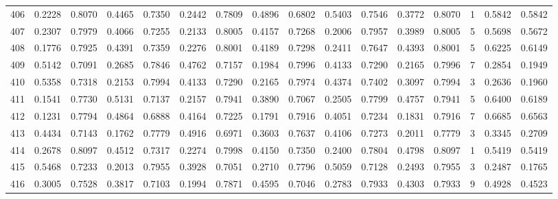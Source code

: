 \begin{tabular}{lrrrrrrrrrrrrrrr}
406 &      0.2228 &  0.8070 &  0.4465 &  0.7350 &  0.2442 &  0.7809 &  0.4896 &  0.6802 &  0.5403 &  0.7546 &   0.3772 &     0.8070 &      1 &                    0.5842 &                     0.5842 \\
407 &      0.2307 &  0.7979 &  0.4066 &  0.7255 &  0.2133 &  0.8005 &  0.4157 &  0.7268 &  0.2006 &  0.7957 &   0.3989 &     0.8005 &      5 &                    0.5698 &                     0.5672 \\
408 &      0.1776 &  0.7925 &  0.4391 &  0.7359 &  0.2276 &  0.8001 &  0.4189 &  0.7298 &  0.2411 &  0.7647 &   0.4393 &     0.8001 &      5 &                    0.6225 &                     0.6149 \\
409 &      0.5142 &  0.7091 &  0.2685 &  0.7846 &  0.4762 &  0.7157 &  0.1984 &  0.7996 &  0.4133 &  0.7290 &   0.2165 &     0.7996 &      7 &                    0.2854 &                     0.1949 \\
410 &      0.5358 &  0.7318 &  0.2153 &  0.7994 &  0.4133 &  0.7290 &  0.2165 &  0.7974 &  0.4374 &  0.7402 &   0.3097 &     0.7994 &      3 &                    0.2636 &                     0.1960 \\
411 &      0.1541 &  0.7730 &  0.5131 &  0.7137 &  0.2157 &  0.7941 &  0.3890 &  0.7067 &  0.2505 &  0.7799 &   0.4757 &     0.7941 &      5 &                    0.6400 &                     0.6189 \\
412 &      0.1231 &  0.7794 &  0.4864 &  0.6888 &  0.4164 &  0.7225 &  0.1791 &  0.7916 &  0.4051 &  0.7234 &   0.1831 &     0.7916 &      7 &                    0.6685 &                     0.6563 \\
413 &      0.4434 &  0.7143 &  0.1762 &  0.7779 &  0.4916 &  0.6971 &  0.3603 &  0.7637 &  0.4106 &  0.7273 &   0.2011 &     0.7779 &      3 &                    0.3345 &                     0.2709 \\
414 &      0.2678 &  0.8097 &  0.4512 &  0.7317 &  0.2274 &  0.7998 &  0.4150 &  0.7350 &  0.2400 &  0.7804 &   0.4798 &     0.8097 &      1 &                    0.5419 &                     0.5419 \\
415 &      0.5468 &  0.7233 &  0.2013 &  0.7955 &  0.3928 &  0.7051 &  0.2710 &  0.7796 &  0.5059 &  0.7128 &   0.2493 &     0.7955 &      3 &                    0.2487 &                     0.1765 \\
416 &      0.3005 &  0.7528 &  0.3817 &  0.7103 &  0.1994 &  0.7871 &  0.4595 &  0.7046 &  0.2783 &  0.7933 &   0.4303 &     0.7933 &      9 &                    0.4928 &                     0.4523 \\

\end{tabular}
